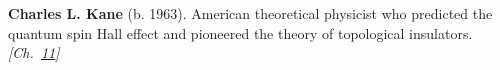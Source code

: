 \textbf{Charles L. Kane} (b. 1963). American theoretical physicist who predicted the quantum spin Hall effect and pioneered the theory of topological insulators. \emph{[Ch.~\hyperref[ch:topologicalinsulators]{11}]}

